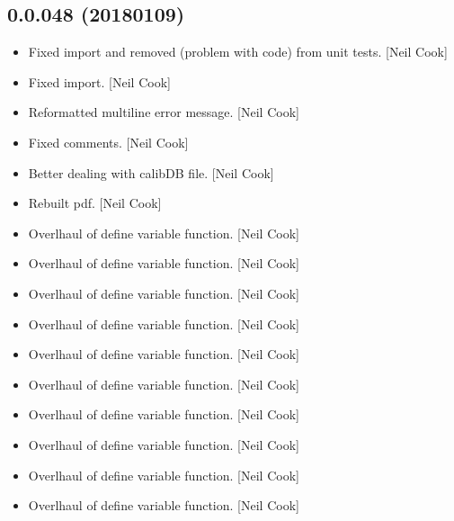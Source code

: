 \documentclass[a4paper,10pt,english]{report}
\begin{document}
\subsection{0.0.048 (2018\sphinxhyphen{}01\sphinxhyphen{}09)}
\label{\detokenize{misc/changelog:id524}}\begin{itemize}
\item {} 
Fixed import and removed  (problem with code) from unit tests.
{[}Neil Cook{]}

\item {} 
Fixed import. {[}Neil Cook{]}

\item {} 
Reformatted multi\sphinxhyphen{}line error message. {[}Neil Cook{]}

\item {} 
Fixed comments. {[}Neil Cook{]}

\item {} 
Better dealing with calibDB file. {[}Neil Cook{]}

\item {} 
Rebuilt pdf. {[}Neil Cook{]}

\item {} 
Overlhaul of define variable function. {[}Neil Cook{]}

\item {} 
Overlhaul of define variable function. {[}Neil Cook{]}

\item {} 
Overlhaul of define variable function. {[}Neil Cook{]}

\item {} 
Overlhaul of define variable function. {[}Neil Cook{]}

\item {} 
Overlhaul of define variable function. {[}Neil Cook{]}

\item {} 
Overlhaul of define variable function. {[}Neil Cook{]}

\item {} 
Overlhaul of define variable function. {[}Neil Cook{]}

\item {} 
Overlhaul of define variable function. {[}Neil Cook{]}

\item {} 
Overlhaul of define variable function. {[}Neil Cook{]}

\item {} 
Overlhaul of define variable function. {[}Neil Cook{]}


\end{itemize}
\end{document}

